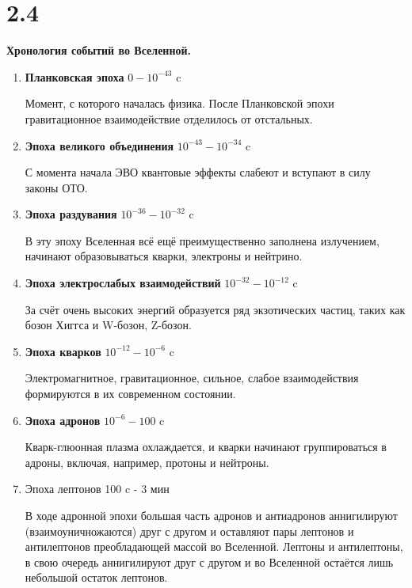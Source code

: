 \documentclass[a4paper,14pt]{article}
\begin{document}
\section*{2.4}

\begin{center}
	\LARGE{\textbf{Хронология событий во Вселенной.}}\\
\end{center}

\begin{enumerate}
\item \textbf{Планковская эпоха}  $0 - 10^{-43}$ c

Момент, с которого началась физика. После Планковской эпохи гравитационное взаимодействие отделилось от отстальных.
\item \textbf{Эпоха великого объединения} $10^{-43} - 10^{-34}$ c

С момента начала ЭВО квантовые эффекты слабеют и вступают в силу законы ОТО.

\item \textbf{Эпоха раздувания} $10^{-36} - 10^{-32}$ c

В эту эпоху Вселенная всё ещё преимущественно заполнена излучением, начинают образовываться кварки, электроны и нейтрино.

\item \textbf{Эпоха электрослабых взаимодействий} $10^{-32} - 10^{-12}$ c

За счёт очень высоких энергий образуется ряд экзотических частиц, таких как бозон Хиггса и W-бозон, Z-бозон.

\item \textbf{Эпоха кварков} $10^{-12} - 10^{-6}$ c

Электромагнитное, гравитационное, сильное, слабое взаимодействия формируются в их современном состоянии.

\item \textbf{Эпоха адронов} $10^{-6} - 100$ c

Кварк-глюонная плазма охлаждается, и кварки начинают группироваться в адроны, включая, например, протоны и нейтроны.

\item Эпоха лептонов 100 c - 3 мин

В ходе адронной эпохи большая часть адронов и антиадронов аннигилируют (взаимоуничножаются) друг с другом и оставляют пары лептонов и антилептонов преобладающей массой во Вселенной. Лептоны и антилептоны, в свою очередь аннигилируют друг с другом и во Вселенной остаётся лишь небольшой остаток лептонов.


\end{enumerate}
\end{document}

